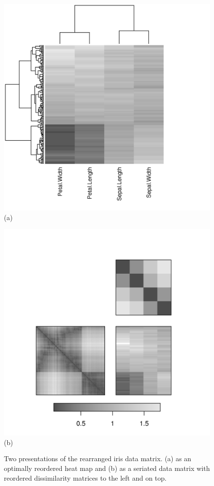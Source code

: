\documentclass[fleqn, a4paper]{article}
\begin{document}
\begin{figure}
    \begin{minipage}[b]{.48\linewidth}
        \centering
        \includegraphics[width=\linewidth]{seriation-heatmap1} \\
            (a)
    \end{minipage}
    \begin{minipage}[b]{.48\linewidth}
        \centering
        \includegraphics[width=\linewidth]{seriation-heatmap2} \\
            (b)
    \end{minipage}
    \caption{Two presentations of the rearranged iris data matrix. (a) as an
optimally reordered heat map and (b) as a seriated data matrix with reordered
dissimilarity matrices to the left and on top.}
    \label{fig:heatmap}
\end{figure}
\end{document}
